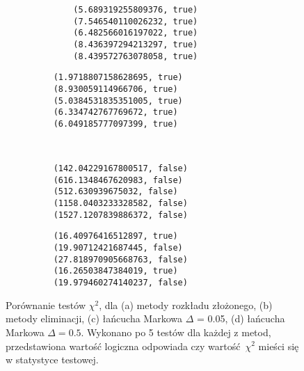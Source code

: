 \documentclass[a4paper,12pt]{article}
\begin{document}
    \begin{figure}[H]
        \centering
        \begin{subfigure}{0.49\textwidth}
            \begin{verbatim}
        (5.689319255809376, true)
        (7.546540110026232, true)
        (6.482566016197022, true)
        (8.436397294213297, true)
        (8.439572763078058, true)
            \end{verbatim}       
            \caption{}    
        \end{subfigure}
        \begin{subfigure}{0.49\textwidth}
            \begin{verbatim}
    (1.9718807158628695, true)
    (8.930059114966706, true)
    (5.0384531835351005, true)
    (6.334742767769672, true)
    (6.049185777097399, true)
            \end{verbatim}       
            \caption{}    
        \end{subfigure}
        \\
        \begin{subfigure}{0.49\textwidth}
            \begin{verbatim}
    (142.04229167800517, false)
    (616.1348467620983, false)
    (512.630939675032, false)
    (1158.0403233328582, false)
    (1527.1207839886372, false)
            \end{verbatim}       
            \caption{}    
        \end{subfigure}
        \begin{subfigure}{0.49\textwidth}
            \begin{verbatim}
    (16.40976416512897, true)
    (19.90712421687445, false)
    (27.818970905668763, false)
    (16.26503847384019, true)
    (19.979460274140237, false)
            \end{verbatim}       
            \caption{}    
        \end{subfigure}

        \caption{Porównanie testów $\chi^2$, dla (a) metody rozkładu złożonego, (b) metody eliminacji, (c) łańcucha Markowa $\Delta$ = 0.05, (d) łańcucha Markowa $\Delta =  0.5$. Wykonano po 5 testów dla każdej z metod, przedstawiona wartość logiczna odpowiada czy wartość $\chi^2$ mieści się w statystyce testowej.}
        \label{chi}
    \end{figure}
\end{document}
